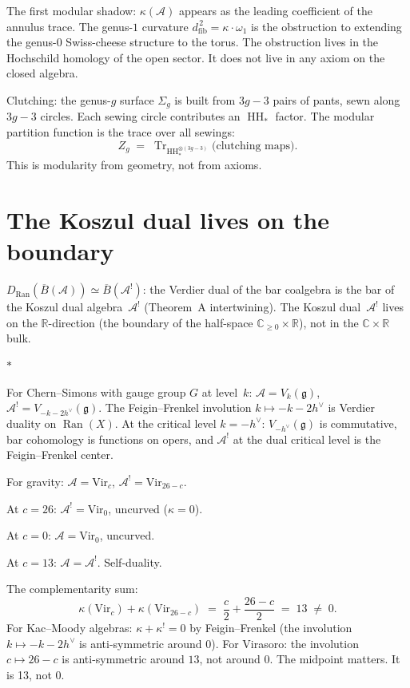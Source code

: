 \documentclass[11pt]{article}
\newcommand{\cA}{\mathcal{A}}
\newcommand{\fg}{\mathfrak{g}}
\newcommand{\barB}{\overline{B}}
\newcommand{\C}{\mathbb{C}}
\newcommand{\R}{\mathbb{R}}
\newcommand{\Ran}{\operatorname{Ran}}
\newcommand{\HH}{\operatorname{HH}}
\newcommand{\Tr}{\operatorname{Tr}}
\newcommand{\dfib}{d_{\mathrm{fib}}}
\newcommand{\sep}{\bigskip\begin{center}$*$\end{center}\medskip}
\begin{document}
The first modular shadow: $\kappa(\cA)$ appears as the leading
coefficient of the annulus trace.  The genus-$1$ curvature
$\dfib^{\,2} = \kappa \cdot \omega_1$ is the obstruction to
extending the genus-$0$ Swiss-cheese structure to the torus.  The
obstruction lives in the Hochschild homology of the open sector.
It does not live in any axiom on the closed algebra.

Clutching: the genus-$g$ surface $\Sigma_g$ is built from $3g-3$
pairs of pants, sewn along $3g-3$ circles.  Each sewing circle
contributes an $\HH_*$ factor.  The modular partition function is
the trace over all sewings:
\[
Z_g
\;=\;
\Tr_{\HH_*^{\otimes(3g-3)}}
\bigl(\text{clutching maps}\bigr).
\]
This is modularity from geometry, not from axioms.


\section{The Koszul dual lives on the boundary}
\label{sec:koszul-dual-boundary}

$D_{\Ran}(\barB(\cA)) \simeq \barB(\cA^!)$: the Verdier dual of the bar
coalgebra is the bar of the Koszul dual algebra~$\cA^!$
(Theorem~A intertwining).  The Koszul dual~$\cA^!$ lives on
the $\R$-direction (the boundary of the half-space
$\C_{\geq 0} \times \R$), not in the $\C \times \R$ bulk.

\sep

For Chern--Simons with gauge group $G$ at level~$k$:
$\cA = V_k(\fg)$, $\cA^! = V_{-k-2h^\vee}(\fg)$.  The
Feigin--Frenkel involution $k \mapsto -k - 2h^\vee$ is Verdier
duality on $\Ran(X)$.  At the critical level $k = -h^\vee$:
$V_{-h^\vee}(\fg)$ is commutative, bar cohomology is functions on
opers, and $\cA^!$ at the dual critical level is the
Feigin--Frenkel center.

For gravity: $\cA = \mathrm{Vir}_c$,
$\cA^! = \mathrm{Vir}_{26-c}$.

At $c = 26$: $\cA^! = \mathrm{Vir}_0$, uncurved
($\kappa = 0$).

At $c = 0$: $\cA = \mathrm{Vir}_0$, uncurved.

At $c = 13$: $\cA = \cA^!$.  Self-duality.

\medskip

The complementarity sum:
\[
\kappa(\mathrm{Vir}_c) + \kappa(\mathrm{Vir}_{26-c})
\;=\; \frac{c}{2} + \frac{26-c}{2} \;=\; 13 \;\neq\; 0.
\]
For Kac--Moody algebras: $\kappa + \kappa^! = 0$ by
Feigin--Frenkel (the involution $k \mapsto -k-2h^\vee$ is
anti-symmetric around $0$).  For Virasoro: the involution
$c \mapsto 26-c$ is anti-symmetric around $13$, not around $0$.
The midpoint matters.  It is 13, not 0.
\end{document}
